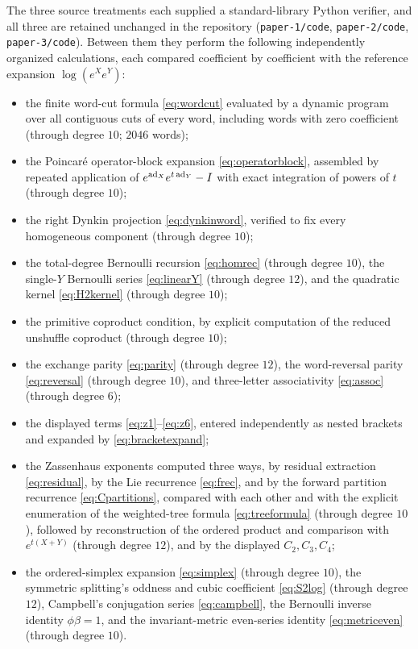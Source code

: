 The three source treatments each supplied a standard-library Python
verifier, and all three are retained unchanged in the repository
(\texttt{paper-1/code}, \texttt{paper-2/code}, \texttt{paper-3/code}). Between
them they perform the following independently organized calculations, each
compared coefficient by coefficient with the reference expansion
$\log(e^Xe^Y)$:
\begin{itemize}
\item the finite word-cut formula \eqref{eq:wordcut} evaluated by a dynamic
program over all contiguous cuts of every word, including words with zero
coefficient (through degree $10$; $2046$ words);
\item the Poincar\'e operator-block expansion \eqref{eq:operatorblock},
assembled by repeated application of $e^{\operatorname{ad}_X}e^{t\operatorname{ad}_Y}-I$ with exact
integration of powers of $t$ (through degree $10$);
\item the right Dynkin projection \eqref{eq:dynkinword}, verified to fix
every homogeneous component (through degree $10$);
\item the total-degree Bernoulli recursion \eqref{eq:homrec} (through
degree $10$), the single-$Y$ Bernoulli series \eqref{eq:linearY} (through
degree $12$), and the quadratic kernel \eqref{eq:H2kernel} (through degree
$10$);
\item the primitive coproduct condition, by explicit computation of the
reduced unshuffle coproduct (through degree $10$);
\item the exchange parity \eqref{eq:parity} (through degree $12$), the
word-reversal parity \eqref{eq:reversal} (through degree $10$), and
three-letter associativity \eqref{eq:assoc} (through degree $6$);
\item the displayed terms \eqref{eq:z1}--\eqref{eq:z6}, entered
independently as nested brackets and expanded by \eqref{eq:bracketexpand};
\item the Zassenhaus exponents computed three ways, by residual extraction
\eqref{eq:residual}, by the Lie recurrence \eqref{eq:frec}, and by the
forward partition recurrence \eqref{eq:Cpartitions}, compared with each
other and with the explicit enumeration of the weighted-tree formula
\eqref{eq:treeformula} (through degree $10$), followed by reconstruction of
the ordered product and comparison with $e^{t(X+Y)}$ (through degree
$12$), and by the displayed $C_2,C_3,C_4$;
\item the ordered-simplex expansion \eqref{eq:simplex} (through degree
$10$), the symmetric splitting's oddness and cubic coefficient
\eqref{eq:S2log} (through degree $12$), Campbell's conjugation series
\eqref{eq:campbell}, the Bernoulli inverse identity $\phi\beta=1$, and the
invariant-metric even-series identity \eqref{eq:metriceven} (through degree
$10$).
\end{itemize}
